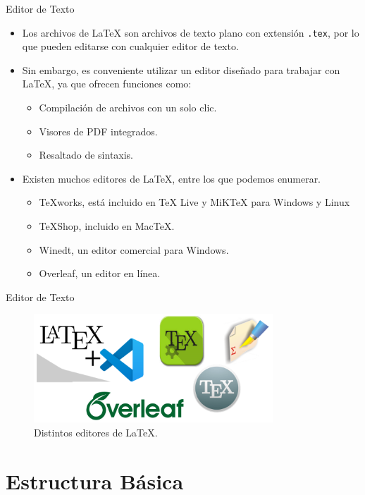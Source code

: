 \documentclass[12pt]{beamer}
\begin{document}
\begin{frame}{Editor de Texto}
  \begin{itemize}
    \item Los archivos de \LaTeX{} son archivos de texto plano con extensión {\color{blue}\texttt{.tex}}, por lo que pueden editarse con cualquier editor de texto.
    \item<2-> Sin embargo, es conveniente utilizar un editor diseñado para trabajar con LaTeX, ya que ofrecen funciones como:
    \begin{itemize}
      \item<3-> Compilación de archivos con un solo clic.
      \item<4-> Visores de PDF integrados.
      \item<5-> Resaltado de sintaxis.
    \end{itemize}
    \item<6-> Existen muchos editores de \LaTeX{}, entre los que podemos enumerar.
    \begin{itemize}
      \item<7-> TeXworks, está incluido en TeX Live y MiKTeX para Windows y Linux
      \item<8-> TeXShop, incluido en MacTeX.
      \item<9-> Winedt, un editor comercial para Windows.
      \item<10-> Overleaf, un editor en línea.
    \end{itemize}    
  \end{itemize}
\end{frame}
\begin{frame}{Editor de Texto}  
    \begin{figure}
      \centering
      \includegraphics[width=0.8\textwidth]{Editores.png}
      \caption{Distintos editores de \LaTeX.}
      \label{fig:ejemplo_imagen}
    \end{figure}
\end{frame}
\section{Estructura Básica}
\end{document}
